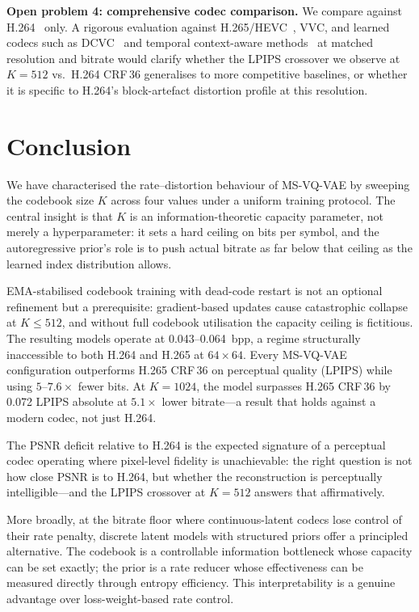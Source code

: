 \documentclass[sigconf, screen, review, anonymous]{acmart}
\begin{document}
\noindent\textbf{Open problem 4: comprehensive codec comparison.}
We compare against H.264~\cite{wiegand2003h264} only. A rigorous
evaluation against H.265/HEVC~\cite{sullivan2012hevc}, VVC, and
learned codecs such as DCVC~\cite{li2021dcvc} and temporal
context-aware methods~\cite{sheng2022temporal} at matched resolution
and bitrate would clarify whether the LPIPS crossover we observe at
$K{=}512$ vs.\ H.264 CRF\,36 generalises to more competitive baselines,
or whether it is specific to H.264's block-artefact distortion profile
at this resolution.

\section{Conclusion}
\label{sec:conclusion}

We have characterised the rate--distortion behaviour of MS-VQ-VAE by
sweeping the codebook size $K$ across four values under a uniform
training protocol. The central insight is that $K$ is an
information-theoretic capacity parameter, not merely a hyperparameter:
it sets a hard ceiling on bits per symbol, and the autoregressive
prior's role is to push actual bitrate as far below that ceiling as the
learned index distribution allows.

EMA-stabilised codebook training with dead-code restart is not an
optional refinement but a prerequisite: gradient-based updates cause
catastrophic collapse at $K \leq 512$, and without full codebook
utilisation the capacity ceiling is fictitious. The resulting models
operate at 0.043--0.064~bpp, a regime structurally inaccessible to
both H.264 and H.265 at $64\!\times\!64$. Every MS-VQ-VAE
configuration outperforms H.265 CRF\,36 on perceptual quality (LPIPS)
while using $5$--$7.6\times$ fewer bits. At $K{=}1024$, the model
surpasses H.265 CRF\,36 by 0.072 LPIPS absolute at $5.1\times$ lower
bitrate---a result that holds against a modern codec, not just H.264.

The PSNR deficit relative to H.264 is the expected signature of a
perceptual codec operating where pixel-level fidelity is unachievable:
the right question is not how close PSNR is to H.264, but whether the
reconstruction is perceptually intelligible---and the LPIPS crossover
at $K{=}512$ answers that affirmatively.

More broadly, at the bitrate floor where continuous-latent codecs lose
control of their rate penalty, discrete latent models with structured
priors offer a principled alternative. The codebook is a controllable
information bottleneck whose capacity can be set exactly; the prior is
a rate reducer whose effectiveness can be measured directly through
entropy efficiency. This interpretability is a genuine advantage over
loss-weight-based rate control.
\end{document}
